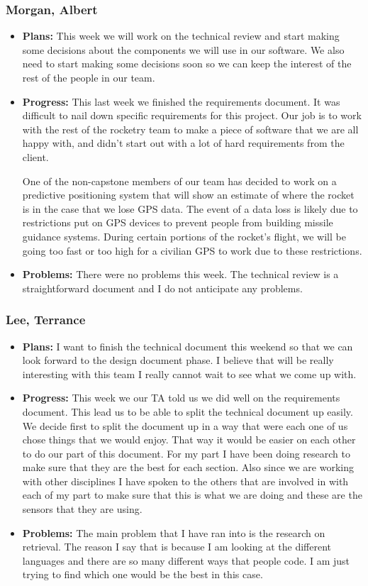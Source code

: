 \documentclass[10pt,draftclsnofoot,onecolumn]{IEEEtran}
\begin{document}
\subsubsection{Morgan, Albert}
\begin{itemize}
	\item \textbf{Plans: }
	This week we will work on the technical review and start making some decisions about the components we will use in our software. We also need to start making some decisions soon so we can keep the interest of the rest of the people in our team.
	\item \textbf{Progress: }
	This last week we finished the requirements document. It was difficult to nail down specific requirements for this project. Our job is to work with the rest of the rocketry team to make a piece of software that we are all happy with, and didn't start out with a lot of hard requirements from the client.

	One of the non-capstone members of our team has decided to work on a predictive positioning system that will show an estimate of where the rocket is in the case that we lose GPS data. The event of a data loss is likely due to restrictions put on GPS devices to prevent people from building missile guidance systems. During certain portions of the rocket's flight, we will be going too fast or too high for a civilian GPS to work due to these restrictions.
	\item \textbf{Problems: }
	There were no problems this week. The technical review is a straightforward document and I do not anticipate any problems.
\end{itemize}
\subsubsection{Lee, Terrance}
\begin{itemize}
	\item \textbf{Plans: }
	I want to finish the technical document this weekend so that we can look forward to the design document phase. I believe that will be really interesting with this team I really cannot wait to see what we come up with.
	\item \textbf{Progress: }
	This week we our TA told us we did well on the requirements document. This lead us to be able to split the technical document up easily. We decide first to split the document up in a way that were each one of us chose things that we would enjoy. That way it would be easier on each other to do our part of this document. For my part I have been doing research to make sure that they are the best for each section. Also since we are working with other disciplines I have spoken to the others that are involved in with each of my part to make sure that this is what we are doing and these are the sensors that they are using.
	\item \textbf{Problems: }
	The main problem that I have ran into is the research on retrieval. The reason I say that is because I am looking at the different languages and there are so many different ways that people code. I am just trying to find which one would be the best in this case.
\end{itemize}
\end{document}
